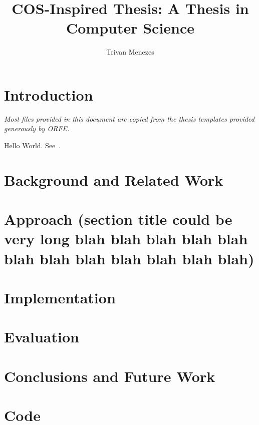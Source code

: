 \documentclass[12pt,lot,lof]{puthesis_undergraduate}
\title{COS-Inspired Thesis: A Thesis in Computer Science}
\author{Trivan Menezes}
\begin{document}
\chapter{Introduction}\label{ch:intro}  %

\emph{Most files provided in this document are copied from the thesis templates provided generously by ORFE.}

Hello World. See~\cite{A01}.


\chapter{Background and Related Work}  %


\chapter{Approach (section title could be very long blah blah blah blah blah blah blah blah blah blah blah blah)} 


\chapter{Implementation}


\chapter{Evaluation}


\chapter{Conclusions and Future Work}


\appendix
\chapter{Code}



 \label{bib}
\end{document}
